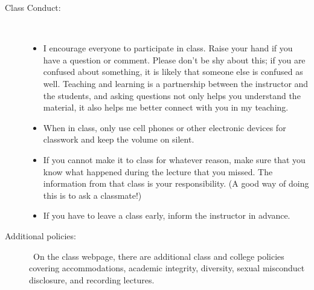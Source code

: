 \documentclass [letterpaper,11pt]{article}
\begin{document}
\begin{description}
\item[Class Conduct:] \
   \begin{itemize}\setlength{\itemsep}{0em}\setlength{\parskip}{0pt}
   	\item I encourage everyone to participate in class.  Raise your hand if you have
	a question or comment.  Please don't be shy about this; if you are confused about
	something, it is likely that someone else is confused as well.
		Teaching and learning is a partnership between the instructor and the students, and asking questions not only helps you understand the material, it also helps me better connect with you in my teaching.
	\item When in class, only use cell phones or other electronic devices for classwork and keep the volume on silent.
	\item  If you cannot make it to class for whatever reason, make sure that you know what happened during the lecture that you missed. The information from that class is your responsibility. (A good way of doing this is to ask a classmate!)
     \item  If you have to leave a class early, inform the instructor in advance. 
     \end{itemize}
     
\item[Additional policies:] \
On the class webpage, there are additional class and college policies covering accommodations, academic integrity, diversity, sexual misconduct disclosure, and recording lectures.  
   
   
\end{description}

   
\end{document}
